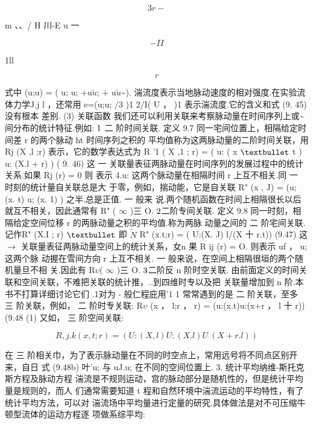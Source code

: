 \[3r-\]

m 、、/ H 川-E u 一

\[-II\]

1ll

\begin{equation*}r\tag{9.45}\end{equation*}

式中 (u;u) = ( u; u; +u$\tilde{u}$; + u$\tilde{u}$\textasciitilde{}). 湍流度表示当地脉动速度的相对强度.在实验流 体力学J.j l ，还常用 e=(u;u; /3 )1 2/I( U ， )1 表示湍流度.它的含义和式 (9. 45) 没有根本 差别. (3) 关联函数 我们还可以利用关联来考察脉动量在时间序列上或\textasciitilde{}间分布的统计特征.例如: ${\rm 1}$ 二 阶时间关联. 定义 9.7 同一宅间位置上，相隔给定时间差 r 的两个脉动 ht 时间序列之积的 平均值称为这两脉动量的二阶时间关联，用 Rj (X ,l ;r) 表示，它的数学表达式为 R '1 ( X ,1 ; r) = ( u: ( x ${\rm •}$ t ) u: (X.l + r) ) ( 9. 46) 这 一 关联量表征两脉动量在时间序列的发展过程中的统计关系.如果 Rj (r) = 0 则 表示 4.u: 这两个脉动量在相隔时间 r 上互不相关.同 一 时刻的统计量自关联总是大 于零，例如，揣动能，它是自关联 R" (x , J) = (u; (x. t) u; (x. 1) ) 之半.总是正值. 一 般来 说.两个随机函数在时间上相隔很长以后就互不相关，因此通常有 R" ( $\infty$ )三 O. ${\rm 2}$二阶专间关联. 定义 9.8 同一时刻，相隔给定空间位移 r 的两脉动量之积的平均值.称为两脉 动量之间的 二 阶宅间关联.记作R" (X.I ; r) ${\rm •}$ 即 $\tilde{N}$ R" (x.t;r) = ( U:(X. J) l/(X 十 r.t)) (9.47) 这 $\rightarrow$ 关联量表征两脉动量空间上的统计关系，女n 果 R ij (r) = O. 则表示 uf ， u; 这两个脉 动握在雪间方向 r 上互不相关. 一 般来说，在空间上相隔很垣的两个随机量旦不相 关.因此有 R$\upsilon$( $\infty$ )三 O. ${\rm 3}$二阶反 n 阶时空关联. 由前面定义的时间关联和空间关联，不难把关联的统计推，..到四维时专以及把 关联量增加到 n 阶.本书不打算详细讨论它们 .1对为 - 般仁程庇用'1 1 常常遇到的是 二 阶关联，至多 三 阶关联，例如， 二 阶时专关联: R$\upsilon$ (x ， l;r ， r) = (u:(x.t)u:(x+r ， l 十 r)) (9.48 (1) 又如， 三 阶空间关联:

\begin{equation*}R,j.k(x ,t;r) = (U:(X ,  l)U:(X.l)U~(X + r.l))\tag{9.48b}\end{equation*}

在 三 阶相关巾，为了表示脉动量在不同的时空点上，常用远号将不同点区别开来，自日 式 (9.48b) 叶'u; 与 uJ.u; 在不同的空间位置上. 3. 统计平均纳维-斯托克斯方程及脉动方程 湍流是不规则运动，宫的脉动部分是随机性的，但是统计平均量是规则的，而人 们通常需要知道 t 程和自然环境中湍流运动的平均特性，有了统计平均方法，可以对 湍流场中平均量进行定量的研究.具体做法是对不可压缩牛顿型流体的运动方程逐 项做系综平均:

